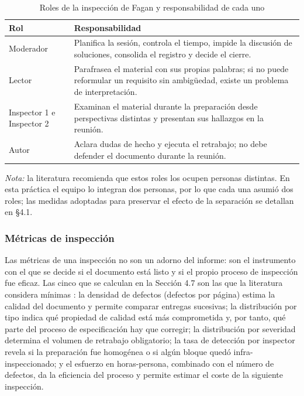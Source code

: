 \documentclass[journal,onecolumn]{IEEEtran}
\begin{document}
	\begin{table}[h]
		\centering
		\caption{Roles de la inspección de Fagan y responsabilidad de cada uno}
		\label{tab:roles-fagan}
		\begin{tabular}{p{3cm}p{10cm}}
			\toprule
			\textbf{Rol} & \textbf{Responsabilidad} \\
			\midrule
			Moderador & Planifica la sesión, controla el tiempo, impide la discusión de soluciones, consolida el registro y decide el cierre. \\
			Lector & Parafrasea el material con sus propias palabras; si no puede reformular un requisito sin ambigüedad, existe un problema de interpretación. \\
			Inspector 1 e Inspector 2 & Examinan el material durante la preparación desde perspectivas distintas y presentan sus hallazgos en la reunión. \\
			Autor & Aclara dudas de hecho y ejecuta el retrabajo; no debe defender el documento durante la reunión. \\
			\bottomrule
		\end{tabular}
	\end{table}
	
	\noindent \textit{Nota:} la literatura recomienda que estos roles los ocupen personas distintas. En esta práctica el equipo lo integran dos personas, por lo que cada una asumió dos roles; las medidas adoptadas para preservar el efecto de la separación se detallan en §4.1.
	
	\subsubsection{Métricas de inspección}
	
	Las métricas de una inspección no son un adorno del informe: son el instrumento con el que se decide si el documento está listo y si el propio proceso de inspección fue eficaz. Las cinco que se calculan en la Sección 4.7 son las que la literatura considera mínimas \cite{gilb,fagan}: la densidad de defectos (defectos por página) estima la calidad del documento y permite comparar entregas sucesivas; la distribución por tipo indica qué propiedad de calidad está más comprometida y, por tanto, qué parte del proceso de especificación hay que corregir; la distribución por severidad determina el volumen de retrabajo obligatorio; la tasa de detección por inspector revela si la preparación fue homogénea o si algún bloque quedó infra-inspeccionado; y el esfuerzo en horas-persona, combinado con el número de defectos, da la eficiencia del proceso y permite estimar el coste de la siguiente inspección.
	
\end{document}
